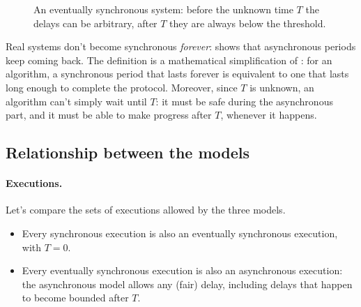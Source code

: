 \begin{figure}[H]
  \centering
  \caption{An eventually synchronous system: before the unknown time $T$ the delays can be arbitrary, after $T$ they are always below the threshold.}
  \label{fig:eventual-sync}
\end{figure}

\begin{framedobs}{}
  Real systems don't become synchronous \textit{forever}:  shows that asynchronous periods keep coming back. The definition is a mathematical simplification of : for an algorithm, a synchronous period that lasts forever is equivalent to one that lasts long enough to complete the protocol. Moreover, since $T$ is unknown, an algorithm can't simply wait until $T$: it must be safe during the asynchronous part, and it must be able to make progress after $T$, whenever it happens.
\end{framedobs}

\subsection{Relationship between the models}

\paragraph{Executions.} Let's compare the sets of executions allowed by the three models.
\begin{itemize}
  \item Every synchronous execution is also an eventually synchronous execution, with $T = 0$.
  \item Every eventually synchronous execution is also an asynchronous execution: the asynchronous model allows any (fair) delay, including delays that happen to become bounded after $T$.
\end{itemize}

